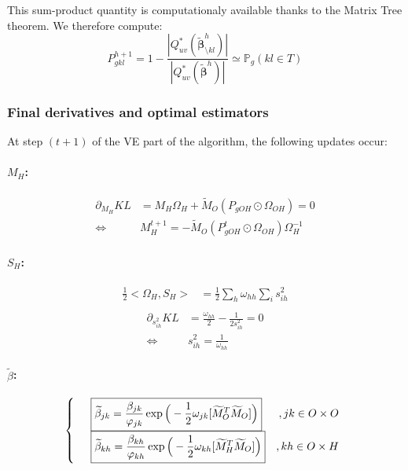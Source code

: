 \documentclass[11pt,a4paper]{article}
\newcommand{\betabf}{\boldsymbol{\beta}}
\begin{document}
This sum-product quantity is computationaly available thanks to the Matrix Tree theorem. We therefore compute:
$$\boxed{P_{gkl}^{h+1} = 1 - \dfrac{|Q_{uv}^*(\widetilde{\betabf}_{\setminus kl}^h)|}{|Q_{uv}^*(\widetilde{\betabf}^h)|} \simeq\mathds{P}_g(kl \in T)}$$

\subsubsection{Final derivatives and optimal estimators}

At step $(t+1)$ of the VE part of the algorithm, the following updates occur:
\paragraph{$M_H$:}
\begin{align*}
\partial_{M_H} KL &= M_H\Omega_H  + \widetilde{M}_O(P_{gOH}\odot\Omega_{OH}) =0\\
\iff& \boxed{M_H^{t+1} =- \widetilde{M}_O(P_{gOH}^t\odot\Omega_{OH})\Omega_H^{-1}}
\end{align*}


\paragraph{$S_H$:}
\begin{align*}
\frac{1}{2}<\Omega_H, S_H> &= \frac{1}{2} \sum_h \omega_{hh}\sum_i s_{ih}^2\\
\end{align*}
\begin{align*}
\partial_{s_{ih}^2} KL &=  \frac{\omega_{hh}}{2}- \frac{1}{2s_{ih}^2} = 0\\
\iff & \boxed{s_{ih}^2 = \frac{1}{\omega_{hh}}}
\end{align*}


\paragraph{$\widetilde{\beta}$:}

\[\left\{\begin{array}{ll r}
&\boxed{\widetilde{\beta}_{jk} =\frac{\beta_{jk}}{\varphi_{jk}}\exp\Big(-\frac{1}{2} \omega_{jk}[\widetilde{M}_O^T \widetilde{M}_O]\Big) }& ,jk \in O\times O\\
&\boxed{\widetilde{\beta}_{kh} =\frac{\beta_{kh}}{\varphi_{kh}}\exp\Big(-\frac{1}{2} \omega_{kh}[\widetilde{M}_H^T \widetilde{M}_O]\Big) }& ,kh \in O\times H
\end{array}\right.\]
\end{document}
